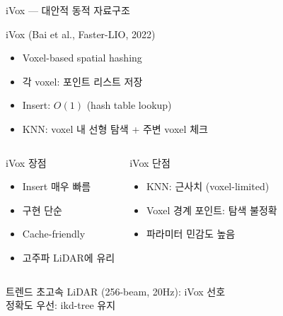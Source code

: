 \begin{frame}{iVox — 대안적 동적 자료구조}
  \begin{block}{iVox (Bai et al., Faster-LIO, 2022)}
    \begin{itemize}
      \item Voxel-based spatial hashing
      \item 각 voxel: 포인트 리스트 저장
      \item Insert: $O(1)$ (hash table lookup)
      \item KNN: voxel 내 선형 탐색 + 주변 voxel 체크
    \end{itemize}
  \end{block}
  \pause
  \begin{columns}
    \begin{block}{iVox 장점}
      \begin{itemize}
        \item Insert 매우 빠름
        \item 구현 단순
        \item Cache-friendly
        \item 고주파 LiDAR에 유리
      \end{itemize}
    \end{block}
    \begin{block}{iVox 단점}
      \begin{itemize}
        \item KNN: 근사치 (voxel-limited)
        \item Voxel 경계 포인트: 탐색 불정확
        \item 파라미터 민감도 높음
      \end{itemize}
    \end{block}
  \end{columns}
  \pause
  \begin{exampleblock}{트렌드}
    초고속 LiDAR (256-beam, 20Hz): iVox 선호\\
    정확도 우선: ikd-tree 유지
  \end{exampleblock}
\end{frame}

